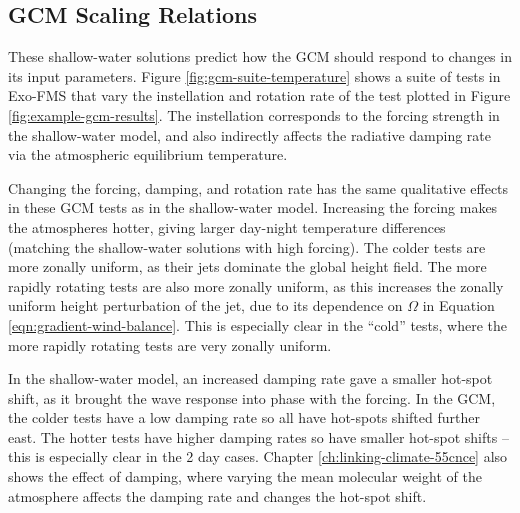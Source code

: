 \subsection{GCM Scaling Relations}

These shallow-water solutions predict how the GCM should respond to changes in its input parameters. Figure \ref{fig:gcm-suite-temperature} shows a suite of tests in Exo-FMS that vary the instellation and rotation rate of the test plotted in Figure \ref{fig:example-gcm-results}. The instellation corresponds to the forcing strength in the shallow-water model, and also indirectly affects the radiative damping rate via the atmospheric equilibrium temperature.

Changing the forcing, damping, and rotation rate has the same qualitative effects in these GCM tests as in the shallow-water model. Increasing the forcing makes the atmospheres hotter, giving larger day-night temperature differences (matching the shallow-water solutions with high forcing). The colder tests are more zonally uniform, as their jets dominate the global height field. The more rapidly rotating tests are also more zonally uniform, as this increases the zonally uniform height perturbation of the jet, due to its dependence on $\Omega$ in Equation \ref{eqn:gradient-wind-balance}. This is especially clear in the ``cold'' tests, where the more rapidly rotating tests are very zonally uniform.

In the shallow-water model, an increased damping rate gave a smaller hot-spot shift, as it brought the wave response into phase with the forcing. In the GCM, the colder tests have a low damping rate so all have hot-spots shifted further east. The hotter tests have higher damping rates so have smaller hot-spot shifts -- this is especially clear in the 2 day cases. Chapter \ref{ch:linking-climate-55cnce} also shows the effect of damping, where varying the mean molecular weight of the atmosphere affects the damping rate and changes the hot-spot shift.


